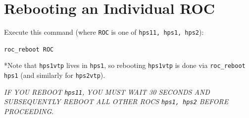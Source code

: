 \documentclass[12pt]{article}
\begin{document}
%
%
%
%



\section{Rebooting an Individual ROC}\label{sec:rebootaroc}
Execute this command (where \texttt{ROC} is one of \texttt{hps11, hps1, hps2}):\newline
\centerline{\texttt{roc\_reboot ROC}}

\vspace{5mm}\noindent
*Note that \texttt{hps1vtp} lives in \texttt{hps1}, so rebooting \texttt{hps1vtp} is done via \texttt{roc\_reboot hps1} (and similarly for \texttt{hps2vtp}).

\vspace{5mm}\noindent
{\em IF YOU REBOOT \texttt{hps11}, YOU MUST WAIT 30 SECONDS AND SUBSEQUENTLY REBOOT ALL OTHER ROCS \texttt{hps1, hps2} BEFORE PROCEEDING}.

        
\end{document}
